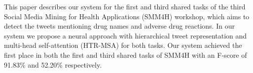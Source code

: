 This paper describes our system for the first and third shared tasks of the third Social Media Mining for Health Applications (SMM4H) workshop, which aims to detect the tweets mentioning drug names and adverse drug reactions. In our system we propose a neural approach with hierarchical tweet representation and multi-head self-attention (HTR-MSA) for both tasks. Our system achieved the first place in both the first and third shared tasks of SMM4H with an F-score of 91.83\% and 52.20\% respectively.

